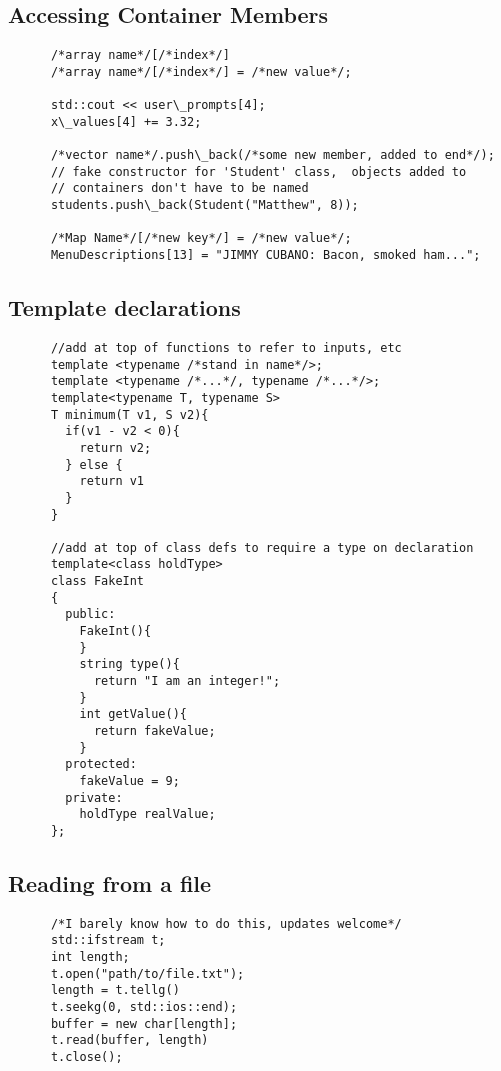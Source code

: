 \documentclass[12pt]{article}
\begin{document}
  \subsection{Accessing Container Members}
    \begin{lstlisting}
      /*array name*/[/*index*/]
      /*array name*/[/*index*/] = /*new value*/;

      std::cout << user\_prompts[4];
      x\_values[4] += 3.32;

      /*vector name*/.push\_back(/*some new member, added to end*/);
      // fake constructor for 'Student' class,  objects added to
      // containers don't have to be named
      students.push\_back(Student("Matthew", 8)); 

      /*Map Name*/[/*new key*/] = /*new value*/;
      MenuDescriptions[13] = "JIMMY CUBANO: Bacon, smoked ham...";
   \end{lstlisting} 
  \subsection{Template declarations}
    \begin{lstlisting}
      //add at top of functions to refer to inputs, etc
      template <typename /*stand in name*/>;
      template <typename /*...*/, typename /*...*/>;
      template<typename T, typename S>
      T minimum(T v1, S v2){
        if(v1 - v2 < 0){
          return v2;
        } else {
          return v1
        }
      }

      //add at top of class defs to require a type on declaration
      template<class holdType>
      class FakeInt
      {
        public:
          FakeInt(){
          }
          string type(){
            return "I am an integer!";
          }
          int getValue(){
            return fakeValue;
          }
        protected:
          fakeValue = 9;
        private:
          holdType realValue;
      };

    \end{lstlisting}
  \subsection{Reading from a file}
    \begin{lstlisting}
      /*I barely know how to do this, updates welcome*/
      std::ifstream t;
      int length;
      t.open("path/to/file.txt");
      length = t.tellg()
      t.seekg(0, std::ios::end);
      buffer = new char[length];
      t.read(buffer, length)
      t.close();
    \end{lstlisting}
\end{document}
